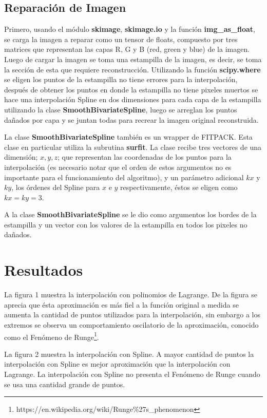 \documentclass[a4paper, 11pt, spanish]{article}
\begin{document}
\subsection{Reparaci\'on de Imagen}
Primero, usando el m\'odulo \textbf{skimage}, \textbf{skimage.io} y la funci\'on \textbf{img\_as\_float}, se carga la imagen a reparar como un tensor de floats, compuesto por tres matrices que representan las capas R, G y B (red, green y blue) de la imagen. Luego de cargar la imagen se toma una estampilla de la imagen, es decir, se toma la secci\'on de esta que requiere reconstrucci\'on. Utilizando la funci\'on \textbf{scipy.where} se eligen los puntos de la estampilla no tiene errores para la interpolaci\'on, despu\'es de obtener los puntos en donde la estampilla no tiene pixeles muertos se hace una interpolaci\'on Spline en dos dimensiones para cada capa de la estampilla utilizando la clase \textbf{SmoothBivariateSpline}, luego se arreglan los puntos da\~nados por capa y se juntan todas para recrear la imagen original reconstruida.

La clase \textbf{SmoothBivariateSpline} tambi\'en es un wrapper de FITPACK. Esta clase en particular utiliza la subrutina \textbf{surfit}. La clase recibe tres vectores de una dimensi\'on; $x, y, z$; que representan las coordenadas de los puntos para la interpolaci\'on (es necesario notar que el orden de estos argumentos no es importante para el funcionamiento del algoritmo), y un par\'ametro adicional $kx$ y $ky$, los \'ordenes del Spline para $x$ e $y$ respectivamente, \'estos se eligen como $kx = ky = 3$.

A la clase \textbf{SmoothBivariateSpline} se le dio como argumentos los bordes de la estampilla y un vector con los valores de la estampilla en todos los pixeles no da\~nados.

\section{Resultados}
La figura 1 muestra la interpolaci\'on con polinomios de Lagrange. De la figura se aprecia que \'esta aproximaci\'on es m\'as fiel a la funci\'on original a medida se aumenta la cantidad de puntos utilizados para la interpolaci\'on, sin embargo a los extremos se observa un comportamiento oscilatorio de la aproximaci\'on, conocido como el Fen\'omeno de Runge\footnote{https://en.wikipedia.org/wiki/Runge\%27s\_phenomenon}.

La figura 2 muestra la interpolaci\'on con Spline. A mayor cantidad de puntos la interpolaci\'on con Spline es mejor aproximaci\'on que la interpolaci\'on con Lagrange. La interpolaci\'on con Spline no presenta el Fen\'omeno de Runge cuando se usa una cantidad grande de puntos.
\end{document}
